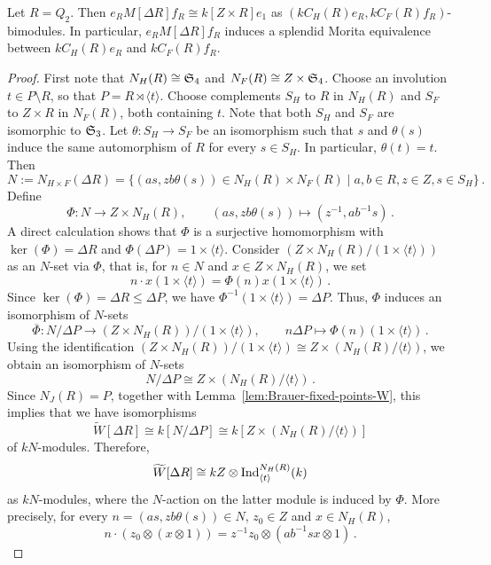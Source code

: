 \begin{lem}\label{lem:Q_2-local-equiv}
    Let $R=Q_2$. Then $e_RM[\Delta R]f_R\cong k[Z\times R]e_1$ as $(kC_H(R)e_R, kC_F(R)f_R)$-bimodules. In particular, $e_RM[\Delta R]f_R$ induces a splendid Morita equivalence between $kC_H(R)e_R$ and $kC_F(R)f_R$.
\end{lem}
\begin{proof}
    First note that $N_H(R)\cong {\mathfrak{S}}_4$ and $N_F(R)\cong Z\times {\mathfrak{S}}_4$. Choose an involution $t\in P\setminus R$, so that $P=R\rtimes \langle t\rangle$. Choose complements $S_H$ to $R$ in $N_H(R)$ and $S_F$ to $Z\times R$ in $N_F(R)$, both containing $t$. Note that both $S_H$ and $S_F$ are isomorphic to ${\mathfrak{S}}_3$. Let $\theta:S_H\longrightarrow S_F$ be an isomorphism such that $s$ and $\theta(s)$ induce the same automorphism of $R$ for every $s\in S_H$. In particular, $\theta(t)=t$. Then
    \[
    N:=N_{H\times F}(\Delta R)=\{(as,zb\theta(s))\in N_H(R)\times N_F(R)\mid a,b\in R, z\in Z, s\in S_H\}\,. 
    \]
    Define 
    \[
    \Phi:N\longrightarrow Z\times N_H(R), \qquad (as, zb\theta(s))\mapsto (z^{-1}, ab^{-1}s)\,.
    \]
    A direct calculation shows that $\Phi$ is a surjective homomorphism with $\ker(\Phi)=\Delta R$ and $\Phi(\Delta P)=1\times\langle t\rangle$. Consider $(Z\times N_H(R)/(1\times\langle t\rangle))$ as an $N$-set via $\Phi$, that is, for $n\in N$ and $x\in Z\times N_H(R)$, we set
    \[
    n\cdot x(1\times \langle t\rangle)=\Phi(n)x(1\times \langle t\rangle)\,.
    \]
    Since $\ker(\Phi)=\Delta R\le \Delta P$, we have $\Phi^{-1}(1\times \langle t\rangle)=\Delta P$. Thus, $\Phi$ induces an isomorphism of $N$-sets
    \[
    \overline{\Phi}: N/\Delta P\longrightarrow (Z\times N_H(R))/(1\times \langle t\rangle), \qquad n\Delta P\mapsto \Phi(n)(1\times \langle t\rangle)\,.
    \]
    Using the identification $(Z\times N_H(R))/(1\times \langle t\rangle)\cong Z\times (N_H(R)/\langle t\rangle)$, we obtain an isomorphism of $N$-sets
    \[
    N/\Delta P\cong Z\times (N_H(R)/\langle t\rangle)\,.
    \]
    Since $N_J(R)=P$, together with Lemma~\ref{lem:Brauer-fixed-points-W}, this implies that we have isomorphisms
    \[
    \widetilde{W}[\Delta R]\cong k[N/\Delta P]\cong k[Z\times (N_H(R)/\langle t\rangle)]
    \]
    of $kN$-modules. Therefore,
    \[
    \widetilde{W}[\Delta R]\cong kZ\otimes \operatorname{Ind}_{\langle t\rangle}^{N_H(R)}(k)
    \]
    as $kN$-modules, where the $N$-action on the latter module is induced by $\Phi$. More precisely, for every $n=(as,zb\theta(s))\in N$, $z_0\in Z$ and $x\in N_H(R)$,
    \[
    n\cdot (z_0\otimes (x\otimes 1))=z^{-1}z_0\otimes (ab^{-1}sx\otimes 1)\,.
\]
\end{proof}
